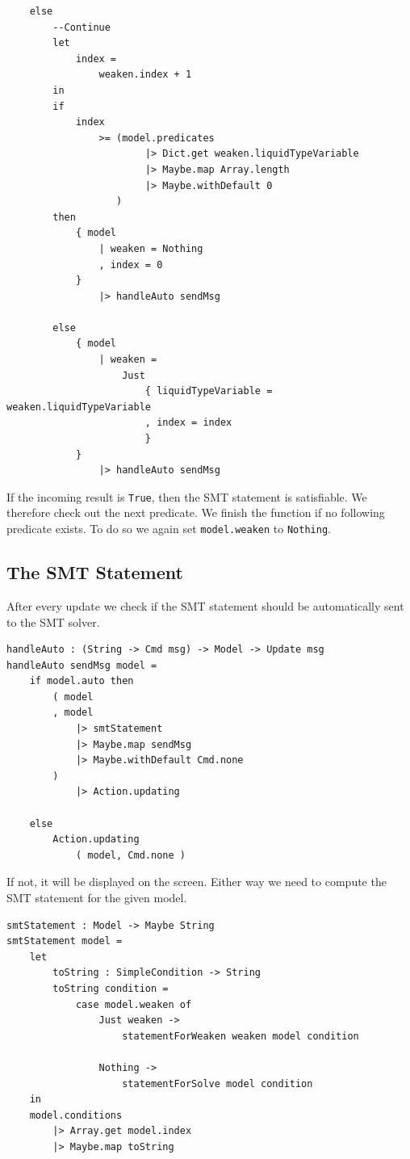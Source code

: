 \documentclass[]{scrbook}
\theoremstyle{definition}
\theoremstyle{definition}
\theoremstyle{definition}
\theoremstyle{remark}
\begin{document}
\text{\textemdash}

\begin{verbatim}
    else
        --Continue
        let
            index =
                weaken.index + 1
        in
        if
            index
                >= (model.predicates
                        |> Dict.get weaken.liquidTypeVariable
                        |> Maybe.map Array.length
                        |> Maybe.withDefault 0
                   )
        then
            { model
                | weaken = Nothing
                , index = 0
            }
                |> handleAuto sendMsg

        else
            { model
                | weaken =
                    Just
                        { liquidTypeVariable = weaken.liquidTypeVariable
                        , index = index
                        }
            }
                |> handleAuto sendMsg
\end{verbatim}

If the incoming result is \texttt{True}, then the SMT statement is
satisfiable. We therefore check out the next predicate. We finish the
function if no following predicate exists. To do so we again set
\texttt{model.weaken} to \texttt{Nothing}.

\subsection{The SMT Statement}\label{the-smt-statement}

After every update we check if the SMT statement should be automatically
sent to the SMT solver.

\begin{verbatim}
handleAuto : (String -> Cmd msg) -> Model -> Update msg
handleAuto sendMsg model =
    if model.auto then
        ( model
        , model
            |> smtStatement
            |> Maybe.map sendMsg
            |> Maybe.withDefault Cmd.none
        )
            |> Action.updating

    else
        Action.updating
            ( model, Cmd.none )
\end{verbatim}

If not, it will be displayed on the screen. Either way we need to
compute the SMT statement for the given model.

\begin{verbatim}
smtStatement : Model -> Maybe String
smtStatement model =
    let
        toString : SimpleCondition -> String
        toString condition =
            case model.weaken of
                Just weaken ->
                    statementForWeaken weaken model condition

                Nothing ->
                    statementForSolve model condition
    in
    model.conditions
        |> Array.get model.index
        |> Maybe.map toString
\end{verbatim}
\end{document}
